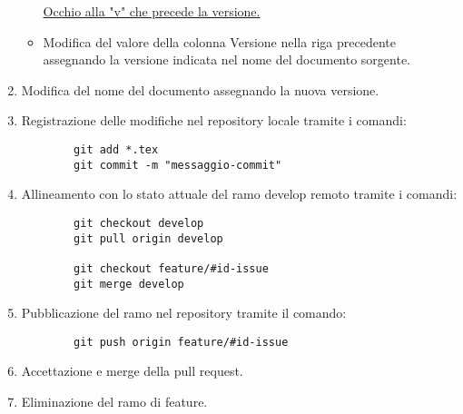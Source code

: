 \documentclass[a4paper, 12pt]{article}
\begin{document}
\begin{enumerate}
\begin{itemize}
        \underline{Occhio alla "v" che precede la versione.}

        \item Modifica del valore della colonna Versione nella riga precedente assegnando la versione indicata nel nome del documento sorgente. 
    \end{itemize}

    \item Modifica del nome del documento assegnando la nuova versione.

    \item Registrazione delle modifiche nel repository locale tramite i comandi:
    \begin{lstlisting}
        git add *.tex
        git commit -m "messaggio-commit"
    \end{lstlisting}

    \item Allineamento con lo stato attuale del ramo develop remoto tramite i comandi:
    \begin{lstlisting}
        git checkout develop
        git pull origin develop

        git checkout feature/#id-issue
        git merge develop
    \end{lstlisting}

    \item Pubblicazione del ramo nel repository tramite il comando:
    \begin{lstlisting}
        git push origin feature/#id-issue
    \end{lstlisting}

    \item Accettazione e merge della pull request.
    
    \item Eliminazione del ramo di feature.
\end{enumerate}
\end{document}
